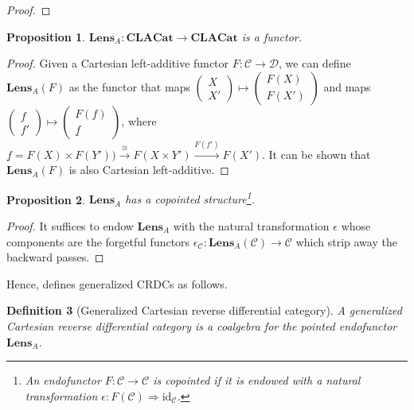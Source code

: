 \documentclass[11pt,a4paper,openright,twoside]{report}
\theoremstyle{plain}
\newtheorem{proposition}{Proposition}
\newtheorem{definition}[proposition]{Definition}
\theoremstyle{definition}
\begin{document}
\begin{proof}
\end{proof}

\begin{proposition}
  $\mathbf{Lens}_A: \mathbf{CLACat} \to \mathbf{CLACat}$ is a functor.
\end{proposition}
\begin{proof}
  Given a Cartesian left-additive functor $F: \mathcal{C} \to \mathcal{D}$, we can define $\mathbf{Lens}_A(F)$ as the functor that maps $\left(\begin{smallmatrix}X  \\ X' \end{smallmatrix}\right) \mapsto \left(\begin{smallmatrix} F(X) \\ F(X') \end{smallmatrix}\right)$ and maps $\left(\begin{smallmatrix}f  \\ f' \end{smallmatrix}\right) \mapsto \left(\begin{smallmatrix} F(f) \\ \underline{f} \end{smallmatrix}\right)$, where $\underline{f} = F(X) \times F(Y')) \stackrel{\cong}{\longrightarrow} F(X \times Y') \stackrel{F(f')}{\longrightarrow}F(X')$. It can be shown that $\mathbf{Lens}_A(F)$ is also Cartesian left-additive.
\end{proof}

\begin{proposition}
  $\mathbf{Lens}_A$ has a copointed structure\footnote{An endofunctor $F: \mathcal{C} \to \mathcal{C}$ is copointed if it is endowed with a natural transformation $\epsilon: F(\mathcal{C}) \Rightarrow \mathrm{id}_{\mathcal{C}}$.}.
\end{proposition}
\begin{proof}
  It suffices to endow $\mathbf{Lens}_A$ with the natural transformation $\epsilon$ whose components are the forgetful functors $\epsilon_{\mathcal{C}}: \mathbf{Lens}_A(\mathcal{C}) \to \mathcal{C}$ which strip away the backward passes.
\end{proof}

Hence, \cite{gavranovic2024fundamental} defines generalized CRDCs as follows.

\begin{definition}[Generalized Cartesian reverse differential category]
  A generalized Cartesian reverse differential category is a coalgebra for the pointed endofunctor $\mathbf{Lens}_A$. 
\end{definition}
\end{document}

